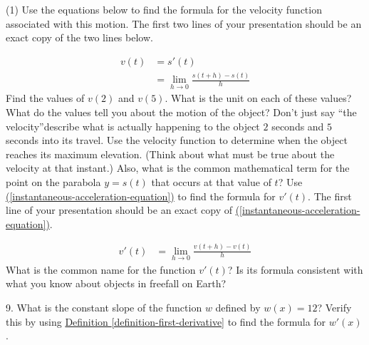 \documentclass[10pt,oneside,]{book}
\theoremstyle{plain}
\theoremstyle{definition}
\numberwithin{equation}{section}
\newcommand{\fe}[2]{#1\mathopen{}\left(#2\right)\mathclose{}}
\newcommand{\fd}[1]{#1'}
\begin{document}
\begin{exercisegroup}(1)
\exercise[4.]\hypertarget{exercise-187}{\null}Use the equations below to find the formula for the velocity function associated with this motion. The first two lines of your presentation should be an exact copy of the two lines below.%
\par
\begin{align*}
\fe{v}{t}&=\fe{\fd{s}}{t}\\
&=\lim_{h\to0}\frac{\fe{s}{t+h}-\fe{s}{t}}{h}
\end{align*}%
\exercise[5.]\hypertarget{exercise-188}{\null}Find the values of \(\fe{v}{2}\) and \(\fe{v}{5}\). What is the unit on each of these values? What do the values tell you about the motion of the object? Don't just say ``the velocity''\textemdash{}describe what is actually happening to the object \(2\) seconds and \(5\) seconds into its travel.%
\exercise[6.]\hypertarget{exercise-189}{\null} Use the velocity function to determine when the object reaches its maximum elevation. (Think about what must be true about the velocity at that instant.) Also, what is the common mathematical term for the point on the parabola \(y=\fe{s}{t}\) that occurs at that value of \(t\)?%
\exercise[7.]\hypertarget{exercise-190}{\null}Use \hyperref[instantaneous-acceleration-equation]{(\ref{instantaneous-acceleration-equation})} to find the formula for \(\fe{\fd{v}}{t}\). The first line of your presentation should be an exact copy of \hyperref[instantaneous-acceleration-equation]{(\ref{instantaneous-acceleration-equation})}.%
\par
\begin{align}
\fe{\fd{v}}{t}&=\lim_{h\to0}\frac{\fe{v}{t+h}-\fe{v}{t}}{h}\label{instantaneous-acceleration-equation}
\end{align}%
\exercise[8.]\hypertarget{exercise-191}{\null}What is the common name for the function \(\fe{\fd{v}}{t}\)? Is its formula consistent with what you know about objects in freefall on Earth?%
\end{exercisegroup}
\par\smallskip\noindent
\begin{exerciselist}
\item[9.]\hypertarget{exercise-192}{\null}What is the constant slope of the function \(w\) defined by \(\fe{w}{x}=12\)? Verify this by using \hyperref[definition-first-derivative]{Definition \ref{definition-first-derivative}} to find the formula for \(\fe{\fd{w}}{x}\).%
\par\smallskip
\end{exerciselist}
\typeout{************************************************}
\typeout{************************************************}
\end{document}
